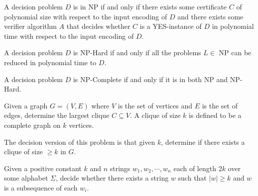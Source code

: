 \begin{definition}[NP]
    A decision problem $D$ is in NP if and only if there exists some certificate $C$ of polynomial size with respect to the input encoding of $D$ and there exists some verifier algorithm $A$ that decides whether $C$ is a YES-instance of $D$ in polynomial time with respect to the input encoding of $D$.
\end{definition}

\begin{definition}[NP-Hard]
    A decision problem $D$ is NP-Hard if and only if all the problems $L \in$ NP can be reduced in polynomial time to $D$.
\end{definition}

\begin{definition}[NP-Complete]
    A decision problem $D$ is NP-Complete if and only if it is in both NP and NP-Hard.
\end{definition}

\begin{definition}
    Given a graph $G = (V, E)$ where $V$ is the set of vertices and $E$ is the set of edges, determine the largest clique $C \subseteq V$. A clique of size $k$ is defined to be a complete graph on $k$ vertices.

    The decision version of this problem is that given $k$, determine if there exists a clique of size $\geq k$ in $G$.
\end{definition}

\begin{definition}
    Given a positive constant $k$ and $n$ strings $w_1, w_2, \cdots, w_n$ each of length $2k$ over some alphabet $\Sigma$, decide whether there exists a string $w$ such that $|w| \geq k$ and $w$ is a subsequence of each $w_i$.
\end{definition}

